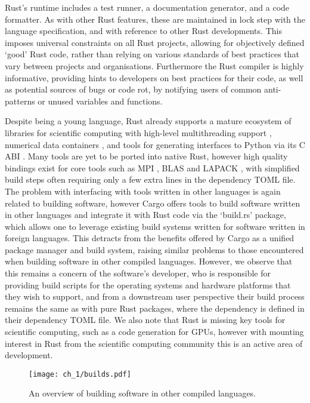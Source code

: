 Rust's runtime includes a test runner, a documentation generator, and a code formatter. As with other Rust features, these are maintained in lock step with the language specification, and with reference to other Rust developments. This imposes universal constraints on all Rust projects, allowing for objectively defined `good' Rust code, rather than relying on various standards of best practices that vary between projects and organisations. Furthermore the Rust compiler is highly informative, providing hints to developers on best practices for their code, as well as potential sources of bugs or code rot, by notifying users of common anti-patterns or unused variables and functions.

Despite being a young language, Rust already supports a mature ecosystem of libraries for scientific computing with high-level multithreading support \cite{rayon2018github}, numerical data containers \cite{ndarray2022github}, and tools for generating interfaces to Python via its C ABI \cite{maturin2022github}. Many tools are yet to be ported into native Rust, however high quality bindings exist for core tools such as MPI \cite{rsmpi2018github}, BLAS and LAPACK \cite{blaslapackrust2022github}, with simplified build steps often requiring only a few extra lines in the dependency TOML file. The problem with interfacing with tools written in other languages is again related to building software, however Cargo offers tools to build software written in other languages and integrate it with Rust code via the `build.rs' package, which allows one to leverage existing build systems written for software written in foreign languages. This detracts from the benefits offered by Cargo as a unified package manager and build system, raising similar problems to those encountered when building software in other compiled languages. However, we observe that this remains a concern of the software's developer, who is responsible for providing build scripts for the operating systems and hardware platforms that they wish to support, and from a downstream user perspective their build process remains the same as with pure Rust packages, where the dependency is defined in their dependency TOML file. We also note that Rust is missing key tools for scientific computing, such as a code generation for GPUs, however with mounting interest in Rust from the scientific computing community this is an active area of development.


\begin{figure}
    \centerline{\texttt{[image: ch\_1/builds.pdf]}}
    \caption{An overview of building software in other compiled languages.}
    \label{fig:chpt:1:sec:2:builds}
\end{figure}
